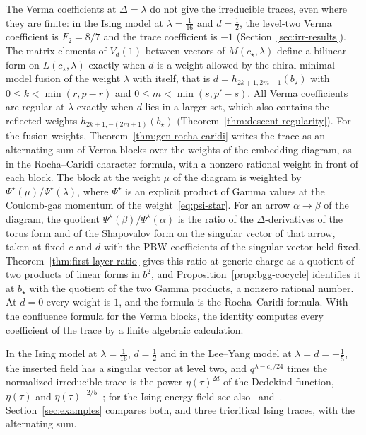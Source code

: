 \documentclass[twoside,10pt]{article}
\numberwithin{equation}{section}
\theoremstyle{slbody}
\theoremstyle{definition}
\theoremstyle{remark}
\begin{document}
The Verma coefficients at \(\Delta=\lambda\) do not give the irreducible
traces, even where they are finite: in the Ising model at
\(\lambda=\tfrac1{16}\) and \(d=\tfrac12\), the level-two Verma coefficient
is \(F_2=8/7\) and the trace coefficient is \(-1\)
(Section~\ref{sec:irr-results}).  The matrix elements of \(V_d(1)\) between
vectors of \(M(c_\star,\lambda)\) define a bilinear form on
\(L(c_\star,\lambda)\) exactly when \(d\) is a weight allowed by the chiral
minimal-model fusion of the weight \(\lambda\) with itself, that is
\(d=h_{2k+1,2m+1}(b_\star)\) with \(0\leq k<\min(r,p-r)\) and
\(0\leq m<\min(s,p'-s)\).  All Verma coefficients are regular at \(\lambda\)
exactly when \(d\) lies in a larger set, which also contains the reflected
weights \(h_{2k+1,-(2m+1)}(b_\star)\) (Theorem~\ref{thm:descent-regularity}).
For the fusion weights, Theorem~\ref{thm:gen-rocha-caridi} writes the trace
as an alternating sum of Verma blocks over the weights of the embedding
diagram, as in the Rocha--Caridi character formula, with a nonzero rational
weight in front of each block.  The block at the weight \(\mu\) of the
diagram is weighted by \(\Psi^\star(\mu)/\Psi^\star(\lambda)\), where
\(\Psi^\star\) is an explicit product of Gamma values at the Coulomb-gas
momentum of the weight~\eqref{eq:psi-star}.  For an arrow \(\alpha\to\beta\) of
the diagram, the quotient \(\Psi^\star(\beta)/\Psi^\star(\alpha)\) is the ratio of the \(\Delta\)-derivatives of the torus form
and of the Shapovalov form on the singular vector of that arrow, taken at
fixed \(c\) and \(d\) with the PBW coefficients of the singular vector held
fixed.  Theorem~\ref{thm:first-layer-ratio} gives this ratio at generic
charge as a quotient of two products of linear forms in \(b^2\), and
Proposition~\ref{prop:bgg-cocycle} identifies it at \(b_\star\) with the
quotient of the two Gamma products, a nonzero rational number.  At \(d=0\)
every weight is \(1\), and the formula is the Rocha--Caridi formula.
With the confluence formula for the Verma blocks, the identity computes
every coefficient of the trace by a finite algebraic calculation.

In the Ising model at \(\lambda=\tfrac1{16}\), \(d=\tfrac12\) and in the
Lee--Yang model at \(\lambda=d=-\tfrac15\), the inserted field has a singular
vector at level two, and \(q^{\lambda-c_\star/24}\) times the normalized
irreducible trace is the power \(\eta(\tau)^{2d}\) of the Dedekind function,
\(\eta(\tau)\) and \(\eta(\tau)^{-2/5}\)~\cite[\S3.1]{GaberdielLang2009}; for
the Ising energy field see also~\cite[\S3.2]{DiFrancescoSaleurZuber1987}
and~\cite[\S4.2.4]{BrehmRunkel2022}.  Section~\ref{sec:examples} compares
both, and three tricritical Ising traces, with the alternating sum.
\end{document}
